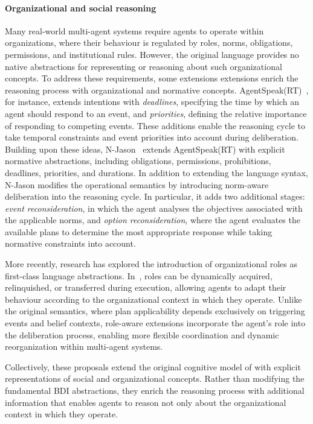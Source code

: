 \paragraph{Organizational and social reasoning}
Many real-world multi-agent systems 
require agents to operate within organizations, 
where their behaviour is regulated by 
roles, 
norms, 
obligations, 
permissions, 
and institutional rules. 
%
However, 
the original \agentspeak{} language 
provides no native abstractions 
for representing or reasoning about such organizational concepts.
%
To address these requirements, 
some extensions extensions enrich 
the \agentspeak{} reasoning process 
with organizational and normative concepts.
%
AgentSpeak(RT)~\cite{agentspeak-rt}, 
for instance, 
extends intentions with \emph{deadlines}, 
specifying the time by which an agent should respond to an event, 
and \emph{priorities}, 
defining the relative importance of responding to competing events. 
%
These additions enable the reasoning cycle 
to take temporal constraints and event priorities into account 
during deliberation.
%
Building upon these ideas, 
N-Jason~\cite{N-Jason} extends AgentSpeak(RT) 
with explicit normative abstractions, including 
obligations, 
permissions, 
prohibitions, 
deadlines, 
priorities, 
and durations. 
%
In addition to extending the language syntax, 
N-Jason modifies the operational semantics by introducing norm-aware deliberation into the reasoning cycle. 
%
In particular, it adds two additional stages: 
\emph{event reconsideration}, 
in which the agent analyses the objectives associated with the applicable norms, 
and \emph{option reconsideration}, 
where the agent evaluates the available plans to determine the most appropriate response while taking normative constraints into account.

More recently, 
research has explored the introduction of organizational roles 
as first-class language abstractions. 
%
In~\cite{dynamic-roles-agentspeak}, 
roles can be dynamically acquired, 
relinquished, 
or transferred during execution, 
allowing agents to adapt their behaviour according to the organizational context in which they operate. 
%
Unlike the original \agentspeak{} semantics, 
where plan applicability depends exclusively on triggering events and belief contexts, 
role-aware extensions incorporate the agent's role into 
the deliberation process, 
enabling more flexible coordination and dynamic reorganization within multi-agent systems.

Collectively, 
these proposals extend the original cognitive model of \agentspeak{} with explicit representations of social and organizational concepts. 
%
Rather than modifying the fundamental \ac{BDI} abstractions, 
they enrich the reasoning process with additional information that enables agents to reason not only about the organizational context in which they operate.


